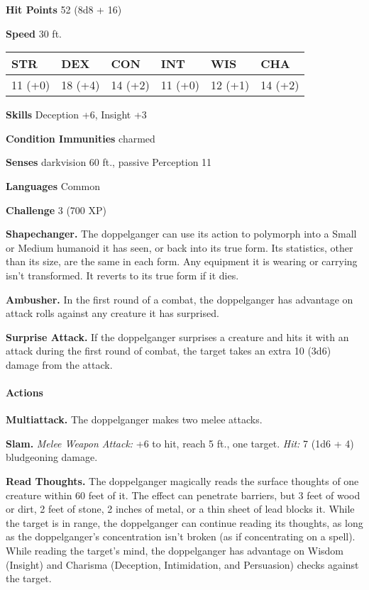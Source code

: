 \documentclass[
]{article}
\begin{document}
\textbf{Hit Points} 52 (8d8 + 16)

\textbf{Speed} 30 ft.

\begin{longtable}[]{@{}llllll@{}}
\toprule
STR & DEX & CON & INT & WIS & CHA\tabularnewline
\midrule
\endhead
11 (+0) & 18 (+4) & 14 (+2) & 11 (+0) & 12 (+1) & 14 (+2)\tabularnewline
\bottomrule
\end{longtable}

\textbf{Skills} Deception +6, Insight +3

\textbf{Condition Immunities} charmed

\textbf{Senses} darkvision 60 ft., passive Perception 11

\textbf{Languages} Common

\textbf{Challenge} 3 (700 XP)

\textbf{Shapechanger.} The doppelganger can use its action to polymorph
into a Small or Medium humanoid it has seen, or back into its true form.
Its statistics, other than its size, are the same in each form. Any
equipment it is wearing or carrying isn't transformed. It reverts to its
true form if it dies.

\textbf{Ambusher.} In the first round of a combat, the doppelganger has
advantage on attack rolls against any creature it has surprised.

\textbf{Surprise Attack.} If the doppelganger surprises a creature and
hits it with an attack during the first round of combat, the target
takes an extra 10 (3d6) damage from the attack.

\hypertarget{actions-22}{%
\paragraph{Actions}\label{actions-22}}

\textbf{Multiattack.} The doppelganger makes two melee attacks.

\textbf{Slam.} \emph{Melee Weapon Attack:} +6 to hit, reach 5 ft., one
target. \emph{Hit:} 7 (1d6 + 4) bludgeoning damage.

\textbf{Read Thoughts.} The doppelganger magically reads the surface
thoughts of one creature within 60 feet of it. The effect can penetrate
barriers, but 3 feet of wood or dirt, 2 feet of stone, 2 inches of
metal, or a thin sheet of lead blocks it. While the target is in range,
the doppelganger can continue reading its thoughts, as long as the
doppelganger's concentration isn't broken (as if concentrating on a
spell). While reading the target's mind, the doppelganger has advantage
on Wisdom (Insight) and Charisma (Deception, Intimidation, and
Persuasion) checks against the target.
\end{document}
